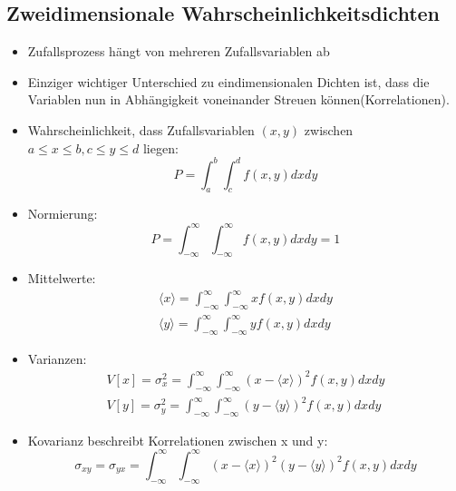 \documentclass[10pt,a4paper]{article}
\begin{document}
\subsection{Zweidimensionale Wahrscheinlichkeitsdichten}
\begin{itemize}
\item Zufallsprozess hängt von mehreren Zufallsvariablen ab
\item Einziger wichtiger Unterschied zu eindimensionalen Dichten ist, dass die Variablen nun in Abhängigkeit voneinander Streuen können(Korrelationen). 
\item Wahrscheinlichkeit, dass Zufallsvariablen $(x,y)$ zwischen $a \le x \le b, c \le y \le d$ liegen:
\begin{equation}
P= \int^{b}_{a}\int^{d}_{c}{f(x,y)dx dy}
\end{equation}
\item Normierung: 
\begin{equation}
P= \int^{\infty}_{-\infty}\int^{\infty}_{-\infty}{f(x,y)dx dy}=1
\end{equation}
\item Mittelwerte:
\begin{align}
\langle x \rangle = \int^{\infty}_{-\infty}\int^{\infty}_{-\infty}{xf(x,y)dx dy} \\
\langle y \rangle = \int^{\infty}_{-\infty}\int^{\infty}_{-\infty}{yf(x,y)dx dy} 
\end{align}
\item Varianzen:
\begin{align}
V[x]= \sigma^2_x= \int^{\infty}_{-\infty}\int^{\infty}_{-\infty}{(x-\langle x \rangle)^2 f(x,y)dx dy} \\
V[y]= \sigma^2_y= \int^{\infty}_{-\infty}\int^{\infty}_{-\infty}{(y-\langle y \rangle)^2 f(x,y)dx dy}
\end{align}
\item Kovarianz beschreibt Korrelationen zwischen x und y:
\begin{equation}
\sigma_{xy}=\sigma_{yx}=\int^{\infty}_{-\infty}\int^{\infty}_{-\infty}{(x-\langle x \rangle)^2(y-\langle y \rangle)^2 f(x,y)dx dy}
\end{equation}


\end{itemize}
\end{document}
